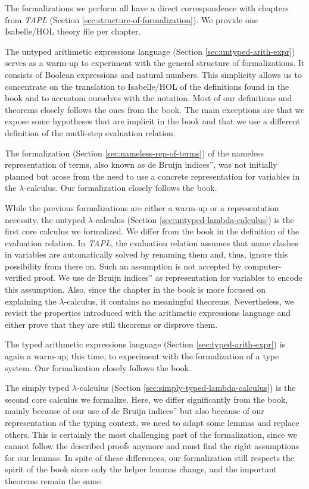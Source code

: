 The formalizations we perform all have a direct correspondence with chapters from \emph{TAPL}
(Section \ref{sec:structure-of-formalization}). We provide one Isabelle/HOL theory file per chapter.

The untyped arithmetic expressions language (Section \ref{sec:untyped-arith-expr}) serves as a
warm-up to experiment with the general structure of formalizations. It consists of Boolean
expressions and natural numbers. This simplicity allows us to concentrate on the translation to
Isabelle/HOL of the definitions found in the book and to accustom ourselves with the notation. Most
of our definitions and theorems closely follows the ones from the book. The main exceptions are
that we expose some hypotheses that are implicit in the book and that we use a different definition
of the mutli-step evaluation relation.

The formalization (Section \ref{sec:nameless-rep-of-terms}) of the nameless representation of terms,
also known as de Bruijn indices'', was not initially planned but arose from the need to use a
concrete representation for variables in the $\lambda$-calculus. Our formalization closely follows
the book.

While the previous formalizations are either a warm-up or a representation necessity, the untyped
$\lambda$-calculus (Section \ref{sec:untyped-lambda-calculus}) is the first core calculus we
formalized. We differ from the book in the definition of the evaluation relation. In \emph{TAPL},
the evaluation relation assumes that name clashes in variables are automatically solved by renaming
them and, thus, ignore this possibility from there on. Such an assumption is not accepted by
computer-verified proof. We use de Bruijn indices'' as representation for variables to encode this
assumption. Also, since the chapter in the book is more focused on explaining the
$\lambda$-calculus, it contains no meaningful theorems. Nevertheless, we revisit the properties
introduced with the arithmetic expressions language and either prove that they are still theorems or
disprove them.

The typed arithmetic expressions language (Section \ref{sec:typed-arith-expr}) is again a warm-up;
this time, to experiment with the formalization of a type system. Our formalization closely follows
the book.

The simply typed $\lambda$-calculus (Section \ref{sec:simply-typed-lambda-calculus}) is the second
core calculus we formalize. Here, we differ significantly from the book, mainly because of our use
of de Bruijn indices'' but also because of our representation of the typing context, we need to
adapt some lemmas and replace others. This is certainly the most challenging part of the
formalization, since we cannot follow the described proofs anymore and must find the right
assumptions for our lemmas. In spite of these differences, our formalization still respects the
spirit of the book since only the helper lemmas change, and the important theorems remain the same.


